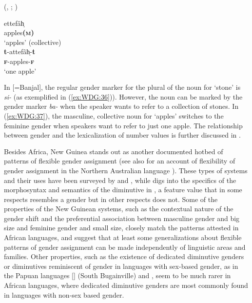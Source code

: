 \documentclass[output=collectionpaper]{langsci/langscibook}
\begin{document}
\ea\label{ex:WDG:37}
 (, ; \citealt[32]{Beguinot1942}) \\
\begin{xlist}
\ex
\gll	ettefâh̩ \\
	apples\textbf{(\textsc{m})} \\
\glt	`apples' (collective) \\
\ex
\gll 	\textbf{t}-attefâh̩-\textbf{t} \\
	\textbf{\textsc{f}}-apples-\textbf{\textsc{f}} \\
\glt	`one apple' \\
\end{xlist}
\z

In  [=Banjal], the regular gender marker for the plural of the noun for `stone' is \textit{si-} (as exemplified in (\ref{ex:WDG:36})). However, the noun can be marked by the gender marker \textit{ba-} when the speaker wants to refer to a collection of stones. In  (\ref{ex:WDG:37}), the masculine, collective noun for `apples' switches to the feminine gender when speakers want to refer to just one apple. The relationship between gender and the lexicalization of number values is further discussed in .

Besides Africa, New Guinea stands out as another documented hotbed of patterns of flexible gender assignment (see also \citealt{Singer2018} for an account of flexibility of gender assignment in the Northern Australian language ). These types of systems and their uses have been surveyed by \cite{Aikhenvald2012} and , while  digs into the specifics of the morphosyntax and semantics of the diminutive in , a feature value that in some respects resembles a gender but in other respects does not. Some of the properties of the New Guinean systems, such as the contextual nature of the gender shift and the preferential association between masculine gender and big size and feminine gender and small size, closely match the patterns attested in African languages, and suggest that at least some generalizations about flexible patterns of gender assignment can be made independently of linguistic areas and families. Other properties, such as the existence of dedicated diminutive genders or diminutives reminiscent of gender in languages with sex-based gender, as in the Papuan languages  [] (South Bugainville) and , seem to be much rarer in African languages, where dedicated diminutive genders are most commonly found in languages with non-sex based gender.
\end{document}
